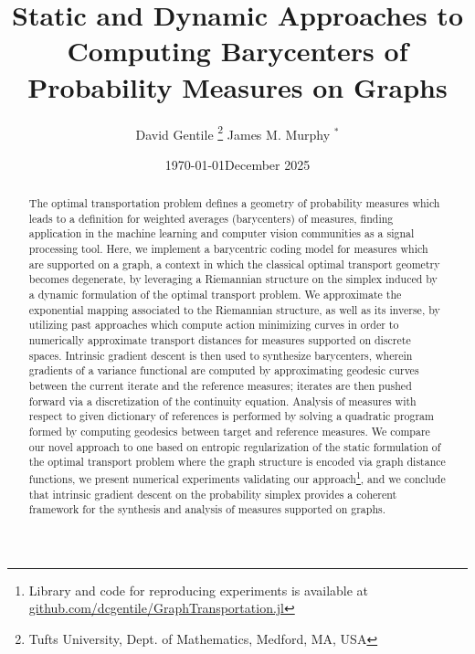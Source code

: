 \documentclass{article}
\date{\today}
\date{December 2025}
\begin{document}
\title{Static and Dynamic Approaches to Computing Barycenters of Probability Measures on Graphs}
\author{David Gentile \thanks{Tufts University, Dept. of Mathematics, Medford, MA, USA} \And James M. Murphy \(^*\)}

\maketitle

\begin{abstract} The optimal transportation problem defines a geometry of probability measures which leads to a definition for weighted averages (barycenters) of measures, finding application in the machine learning and computer vision communities as a signal processing tool. Here, we implement a barycentric coding model for measures which are supported on a graph, a context in which the classical optimal transport geometry becomes degenerate, by leveraging a Riemannian structure on the simplex induced by a dynamic formulation of the optimal transport problem.
We approximate the exponential mapping associated to the Riemannian structure, as well as its inverse, by utilizing past approaches which compute action minimizing curves in order to numerically approximate transport distances for measures supported on discrete spaces. Intrinsic gradient descent is then used to synthesize barycenters, wherein gradients of a variance functional are computed by approximating geodesic curves between the current iterate and the reference measures; iterates are then pushed forward via a discretization of the continuity equation. Analysis of measures with respect to given dictionary of references is performed by solving a quadratic program formed by computing geodesics between target and reference measures. We compare our novel approach to one based on entropic regularization of the static formulation of the optimal transport problem where the graph structure is encoded via graph distance functions, we present numerical experiments validating our approach\footnote{Library and code for reproducing experiments is available at \url{github.com/dcgentile/GraphTransportation.jl}}, and we conclude that intrinsic gradient descent on the probability simplex provides a coherent framework for the synthesis and analysis of measures supported on graphs.
\end{abstract}

\end{document}
